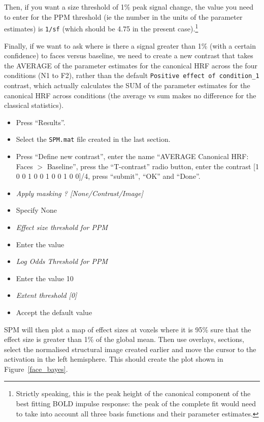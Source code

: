 Then, if you want a size threshold of 1\% peak signal change, the value you need to enter for the PPM threshold (ie the number in the units of the parameter estimates) is \texttt{1/sf} (which should be 4.75 in the present case).\footnote{Strictly speaking, this is the peak height of the canonical component of the best fitting BOLD impulse response: the peak of the complete fit would need to take into account all three basis functions and their parameter estimates.}

Finally, if we want to ask where is there a signal greater than 1\% (with a certain confidence) to faces versus baseline, we need to create a new contrast that takes the AVERAGE of the parameter estimates for the canonical HRF across the four conditions (N1 to F2), rather than the default \texttt{Positive effect of condition\_1} contrast, which actually calculates the SUM of the parameter estimates for the canonical HRF across conditions (the average vs sum makes no difference for the classical statistics).

\begin{itemize}
\item Press ``Results''.
\item Select the \texttt{SPM.mat} file created in the last section.
\item Press ``Define new contrast'', enter the name ``AVERAGE Canonical HRF: Faces $>$ Baseline'', press the ``T-contrast'' radio button, enter the contrast [1 0 0 1 0 0 1 0 0 1 0 0]/4, press ``submit'', ``OK'' and ``Done''.
\item \emph{Apply masking ? [None/Contrast/Image]}
\item Specify None
\item \emph{Effect size threshold for PPM}
\item Enter the value
\item \emph{Log Odds Threshold for PPM}
\item Enter the value 10
\item \emph{Extent threshold [0]}
\item Accept the default value
\end{itemize}
SPM will then plot a map of effect sizes at voxels where it is 95\% sure that the effect size is greater than 1\% of the global mean.
Then use overlays, sections, select the normalised structural image created earlier and move the cursor to the activation in the left hemisphere. This should create the plot shown in Figure~\ref{face_bayes}.


